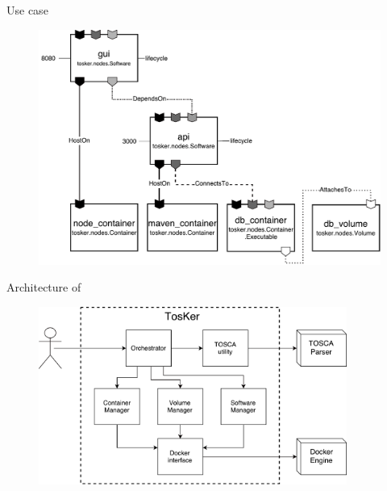 \documentclass{beamer}
\begin{document}
  \begin{frame}{Use case}
    \begin{figure}
      \includegraphics[width=\textwidth]{../thesis/img/thoughts_graph.pdf}
    \end{figure}
  \end{frame}

  \begin{frame}{Architecture of \dt}
    \begin{figure}
        \includegraphics[width=0.9\textwidth]{../thesis/img/tosker_design.pdf}
      \end{figure}
  \end{frame}
\end{document}
